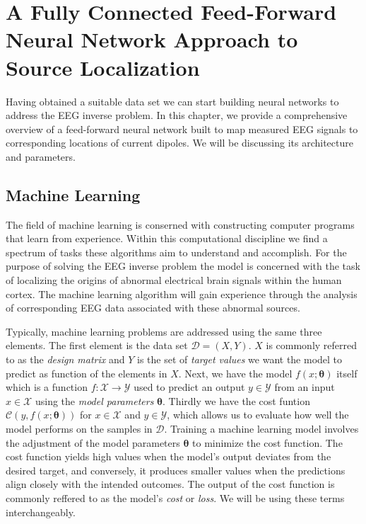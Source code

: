 \documentclass[a4paper, UKenglish, 11pt]{uiomaster}
\begin{document}
\chapter{A Fully Connected Feed-Forward Neural Network Approach to Source Localization}

Having obtained a suitable data set we can start building neural networks to address the EEG inverse problem. In this chapter, we provide a comprehensive overview of a feed-forward neural network built to map measured EEG signals to corresponding locations of current dipoles. We will be discussing its architecture and parameters.

\section{Machine Learning}
The field of machine learning is conserned with constructing computer programs that learn from experience. Within this computational discipline we find a spectrum of tasks these algorithms aim to understand and accomplish. For the purpose of solving the EEG inverse problem the model is concerned with the task of localizing the origins of abnormal electrical brain signals within the human cortex. The machine learning algorithm will gain experience through the analysis of corresponding EEG data associated with these abnormal sources.

Typically, machine learning problems are addressed using the same three elements.
The first element is the data set $\mathcal{D} = (X, Y)$. $X$ is commonly referred to as the \emph{design matrix} and $Y$ is the set of \emph{target values} we want the model to predict as function of the elements in $X$.
Next, we have the model $f(x; \boldsymbol{\theta})$ itself which is a function $f : \mathcal{X} \to \mathcal{Y}$ used to predict an output $y \in \mathcal{Y}$ from an input $x \in \mathcal{X}$ using the \emph{model parameters} $\boldsymbol{\theta}$.
Thirdly we have the cost funtion $\mathcal{C}(y, f(x; \boldsymbol{\theta}))$ for $x \in \mathcal{X}$ and $y \in \mathcal{Y}$, which allows us to evaluate how well the model performs on the samples in $\mathcal{D}$. Training a machine learning model involves the adjustment of the model parameters $\boldsymbol{\theta}$ to minimize the cost function. The cost function yields high values when the model's output deviates from the desired target, and conversely, it produces smaller values when the predictions align closely with the intended outcomes. The output of the cost function is commonly reffered to as the model's \emph{cost} or \emph{loss}. We will be using these terms interchangeably.
\end{document}
